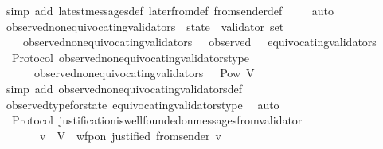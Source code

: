 \begin{isabellebody}
\ {\isacharparenleft}simp\ add{\isacharcolon}\ latest{\isacharunderscore}messages{\isacharunderscore}def\ later{\isacharunderscore}from{\isacharunderscore}def\ from{\isacharunderscore}sender{\isacharunderscore}def{\isacharparenright}\ \isanewline
\ \ \isamarkupfalse%
\ auto%
\endisatagproof
{\isafoldproof}%
%
\isadelimproof
\isanewline
%
\endisadelimproof
\isanewline
\isanewline
{}\isamarkupfalse%
\ observed{\isacharunderscore}non{\isacharunderscore}equivocating{\isacharunderscore}validators\ {\isacharcolon}{\isacharcolon}\ {\isachardoublequoteopen}state\ {\isasymRightarrow}\ validator\ set{\isachardoublequoteclose}\isanewline
\ \ \isanewline
\ \ \ \ {\isachardoublequoteopen}observed{\isacharunderscore}non{\isacharunderscore}equivocating{\isacharunderscore}validators\ {\isasymsigma}\ {\isacharequal}\ observed\ {\isasymsigma}\ {\isacharminus}\ equivocating{\isacharunderscore}validators\ {\isasymsigma}{\isachardoublequoteclose}\isanewline
\isanewline
{}\isamarkupfalse%
\ {\isacharparenleft}\ Protocol{\isacharparenright}\ observed{\isacharunderscore}non{\isacharunderscore}equivocating{\isacharunderscore}validators{\isacharunderscore}type\ {\isacharcolon}\isanewline
\ \ {\isachardoublequoteopen}{\isasymforall}\ {\isasymsigma}\ {\isasymin}\ {\isasymSigma}{\isachardot}\ observed{\isacharunderscore}non{\isacharunderscore}equivocating{\isacharunderscore}validators\ {\isasymsigma}\ {\isasymin}\ Pow\ V{\isachardoublequoteclose}\isanewline
%
\isadelimproof
\ \ %
\endisadelimproof
%
\isatagproof
{}\isamarkupfalse%
\ {\isacharparenleft}simp\ add{\isacharcolon}\ observed{\isacharunderscore}non{\isacharunderscore}equivocating{\isacharunderscore}validators{\isacharunderscore}def{\isacharparenright}\isanewline
\ \ \isamarkupfalse%
\ observed{\isacharunderscore}type{\isacharunderscore}for{\isacharunderscore}state\ equivocating{\isacharunderscore}validators{\isacharunderscore}type\ \isamarkupfalse%
\ auto%
\endisatagproof
{\isafoldproof}%
%
\isadelimproof
\isanewline
%
\endisadelimproof
\isanewline
{}\isamarkupfalse%
\ {\isacharparenleft}\ Protocol{\isacharparenright}\ justification{\isacharunderscore}is{\isacharunderscore}well{\isacharunderscore}founded{\isacharunderscore}on{\isacharunderscore}messages{\isacharunderscore}from{\isacharunderscore}validator{\isacharcolon}\isanewline
\ \ {\isachardoublequoteopen}{\isasymforall}\ {\isasymsigma}\ {\isasymin}\ {\isasymSigma}{\isachardot}\ {\isacharparenleft}{\isasymforall}\ v\ {\isasymin}\ V{\isachardot}\ \ wfp{\isacharunderscore}on\ justified\ {\isacharparenleft}from{\isacharunderscore}sender\ {\isacharparenleft}v{\isacharcomma}\ {\isasymsigma}{\isacharparenright}{\isacharparenright}{\isacharparenright}{\isachardoublequoteclose}\isanewline

\end{isabellebody}
